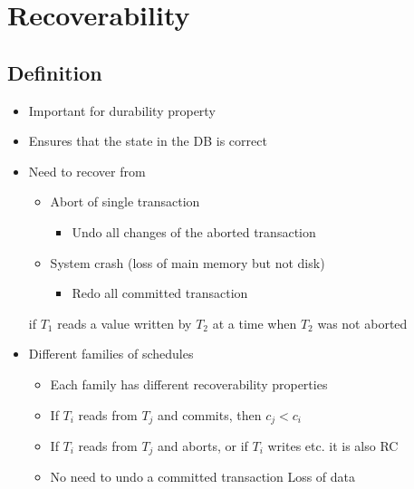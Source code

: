 
\section{Recoverability}
\subsection{Definition}
\begin{itemize}
    \item Important for durability property
    \item Ensures that the state in the DB is correct
    \item Need to recover from
        \begin{itemize}
            \item Abort of single transaction
                \begin{itemize}
                    \item Undo all changes of the aborted transaction
                \end{itemize}
            \item System crash (loss of main memory but not disk)
                \begin{itemize}
                    \item Redo all committed transaction
                \end{itemize}
        \end{itemize}
     if $T_1$ reads a value written by $T_2$ at a time when $T_2$ was not aborted
    \item Different families of schedules
        \begin{itemize}
            \item Each family has different recoverability properties
        \end{itemize}
        \begin{itemize}
            \item If $T_i$ reads from $T_j$ and commits, then $c_j < c_i$
            \item If $T_i$ reads from $T_j$ and aborts, or if $T_i$ writes etc. it is also RC
            \item No need to undo a committed transaction
             Loss of data
        \end{itemize}
        \begin{itemize}

\end{itemize}
\end{itemize}

